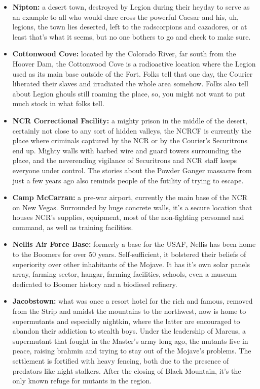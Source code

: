\begin{itemize}
\item \textbf{Nipton:} a desert town, destroyed by Legion during their heyday to serve as an example to all who would dare cross the powerful Caesar and his, uh, legions, the town lies deserted, left to the radscorpions and cazadores, or at least that's what it seems, but no one bothers to go and check to make sure.

\item \textbf{Cottonwood Cove:} located by the Colorado River, far south from the Hoover Dam, the Cottonwood Cove is a radioactive location where the Legion used as its main base outside of the Fort. Folks tell that one day, the Courier liberated their slaves and irradiated the whole area somehow. Folks also tell about Legion ghouls still roaming the place, so, you might not want to put much stock in what folks tell.

\item \textbf{NCR Correctional Facility:} a mighty prison in the middle of the desert, certainly not close to any sort of hidden valleys, the NCRCF is currently the place where criminals captured by the NCR or by the Courier's Securitrons end up. Mighty walls with barbed wire and guard towers surrounding the place, and the neverending vigilance of Securitrons and NCR staff keeps everyone under control. The stories about the Powder Ganger massacre from just a few years ago also reminds people of the futility of trying to escape.

\item \textbf{Camp McCarran:}  a pre-war airport, currently the main base of the NCR on New Vegas. Surrounded by huge concrete walls, it's a secure location that houses NCR's supplies, equipment, most of the non-fighting personnel and command, as well as training facilities.

\item \textbf{Nellis Air Force Base:} formerly a base for the USAF, Nellis has been home to the Boomers for over 50 years. Self-sufficient, it bolstered their beliefs of superiority over other inhabitants of the Mojave. It has it's own solar panels array, farming sector, hangar, farming facilities, schools, even a museum dedicated to Boomer history and a biodiesel refinery. 

\item \textbf{Jacobstown:} what was once a resort hotel for the rich and famous, removed from the Strip and amidst the mountains to the northwest, now is home to supermutants and especially nightkin, where the latter are encouraged to abandon their addiction to stealth boys. Under the leadership of Marcus, a supermutant that fought in the Master's army long ago, the mutants live in peace, raising brahmin and trying to stay out of the Mojave's problems. The settlement is fortified with heavy fencing, both due to the presence of predators like night stalkers. After the closing of Black Mountain, it's the only known refuge for mutants in the region.


\end{itemize}
